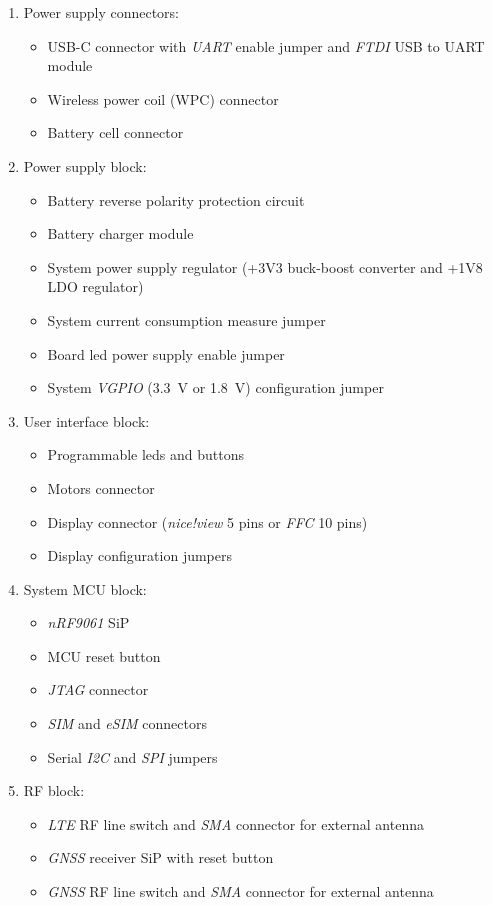 \documentclass[report.tex]{subfiles}
\begin{document}
\begin{enumerate}
\item Power supply connectors:
\begin{itemize}
\item USB-C connector with \textit{UART} enable jumper and \textit{FTDI} USB to UART module
\item Wireless power coil (WPC) connector
\item Battery cell connector
\end{itemize}
\item Power supply block:
\begin{itemize}
\item Battery reverse polarity protection circuit
\item Battery charger module
\item System power supply regulator (+3V3 buck-boost converter and +1V8 LDO regulator)
\item System current consumption measure jumper
\item Board led power supply enable jumper
\item System \textit{VGPIO }(\SI{3.3}{\volt} or \SI{1.8}{\volt}) configuration jumper
\end{itemize}
\pagebreak
\item User interface block:
\begin{itemize}
\item Programmable leds and buttons
\item Motors connector
\item Display connector (\textit{nice!view} 5 pins or \textit{FFC} 10 pins)
\item Display configuration jumpers
\end{itemize}
\item System MCU block:
\begin{itemize}
\item \textit{nRF9061} SiP
\item MCU reset button
\item \textit{JTAG} connector
\item \textit{SIM} and \textit{eSIM} connectors
\item Serial \textit{I2C} and \textit{SPI} jumpers
\end{itemize}
\item RF block:
\begin{itemize}
\item \textit{LTE} RF line switch and \textit{SMA} connector for external antenna
\item \textit{GNSS} receiver SiP with reset button
\item \textit{GNSS} RF line switch and \textit{SMA} connector for external antenna
\end{itemize}
\end{enumerate}
\end{document}
